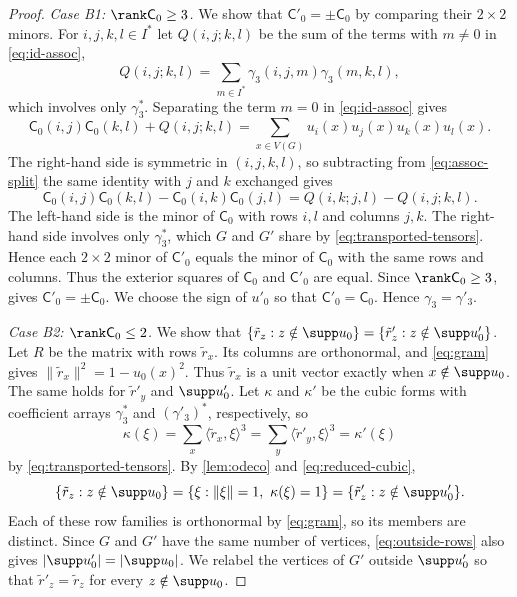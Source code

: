 \begin{proof}
  \emph{Case B1: $\rank \mathsf{C}_0 \geq 3$.} We show that
  $\mathsf C'_0=\pm\mathsf{C}_0$ by comparing their $2\times2$ minors.
  For $i,j,k,l \in I^{*}$ let $Q(i,j;k,l)$ be the sum of the terms with
  $m\neq0$ in \cref{eq:id-assoc},
  \begin{equation}\label{eq:q-tensor}
   Q(i,j;k,l) = \sum_{m \in I^{*}} \gamma_3(i,j,m) \gamma_3(m,k,l),
  \end{equation}
  which involves only $\gamma_3^*$.
  Separating the term $m=0$ in \cref{eq:id-assoc} gives
  \begin{equation}
    \label{eq:assoc-split}
    \mathsf{C}_0(i,j)\mathsf{C}_0(k,l)+Q(i,j;k,l)
    =\sum_{x \in V(G)} u_i(x) u_j(x) u_k(x) u_l(x).
  \end{equation}
  The right-hand side is symmetric in $(i,j,k,l)$, so subtracting from
  \cref{eq:assoc-split} the same identity with $j$ and $k$ exchanged
  gives
  \begin{equation}
    \label{eq:minors}
    \mathsf{C}_0(i,j) \mathsf{C}_0(k,l) - \mathsf{C}_0(i,k) \mathsf{C}_0(j,l) = Q(i,k;j,l) - Q(i,j;k,l).
  \end{equation}
  The left-hand side is the minor of $\mathsf{C}_0$ with rows $i,l$ and
  columns $j,k$. The right-hand side involves only $\gamma_3^*$,
  which $G$ and $G'$ share by \cref{eq:transported-tensors}. Hence each
  $2\times2$ minor of $\mathsf C'_0$ equals the minor of
  $\mathsf{C}_0$ with the same rows and columns.
  Thus the exterior squares of $\mathsf C_0$ and $\mathsf C'_0$ are equal.
  Since $\rank\mathsf C_0\geq3$, \cite[Corollary~4.1]{Greenhill1999}
  gives $\mathsf C'_0=\pm\mathsf C_0$.
  We choose the sign of $u'_0$ so that $\mathsf C'_0=\mathsf{C}_0$.
  Hence $\gamma_3=\gamma'_3$.

  \emph{Case B2: $\rank \mathsf{C}_0 \leq 2$.} We show that
  $\{\tilde{r}_z:z\notin\supp u_0\}=\{\tilde{r}'_z:z\notin\supp u'_0\}$.
  Let $R$ be the matrix with rows $\tilde{r}_x$. Its columns are
  orthonormal, and \cref{eq:gram} gives
  $\lVert\tilde{r}_x\rVert^2=1-u_0(x)^2$.
  Thus $\tilde{r}_x$ is a unit vector exactly when $x\notin\supp u_0$.
  The same holds for $\tilde{r}'_y$ and $\supp u'_0$.
  Let $\kappa$ and $\kappa'$ be the cubic forms with coefficient
  arrays $\gamma_3^*$ and $(\gamma'_3)^*$, respectively, so
  \begin{equation}\label{eq:reduced-cubic}
   \kappa(\xi)=\sum_x\langle\tilde{r}_x,\xi\rangle^3
   =\sum_y\langle\tilde{r}'_y,\xi\rangle^3=\kappa'(\xi)
  \end{equation}
  by \cref{eq:transported-tensors}.
  By \cref{lem:odeco} and \cref{eq:reduced-cubic},
  \begin{equation}\label{eq:outside-rows}
   \{\tilde{r}_z:z\notin\supp u_0\}
   =\{\xi:\lVert \xi\rVert=1,\ \kappa(\xi)=1\}
   =\{\tilde{r}'_z:z\notin\supp u'_0\}.
  \end{equation}
  Each of these row families is orthonormal by \cref{eq:gram}, so its
  members are distinct. Since $G$ and $G'$ have the same number of
  vertices, \cref{eq:outside-rows} also gives
  $|\supp u'_0|=|\supp u_0|$.
  We relabel the vertices of $G'$ outside $\supp u'_0$ so that
  $\tilde{r}'_z=\tilde{r}_z$ for every $z\notin\supp u_0$.


\end{proof}
